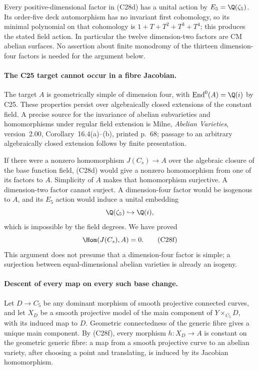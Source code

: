 Every positive-dimensional factor in (C28d) has a
unital action by $E_5=\Q(\zeta_5)$.  Its order-five
deck automorphism has no invariant first cohomology,
so its minimal polynomial on that cohomology is
$1+T+T^2+T^3+T^4$; this produces the stated field action.
In particular the twelve dimension-two factors are
CM abelian surfaces.  No assertion about finite
monodromy of the thirteen dimension-four factors is
needed for the argument below.

\paragraph{The C25 target cannot occur in a fibre Jacobian.}
The target $A$ is geometrically simple of dimension four,
with $\operatorname{End}^0(A)=\Q(i)$ by C25.
These properties persist over algebraically closed
extensions of the constant field.  A precise source
for the invariance of abelian subvarieties and
homomorphisms under regular field extension is Milne,
\emph{Abelian Varieties}, version~2.00, Corollary~16.4(a)--(b),
printed p.~68; passage to an arbitrary algebraically
closed extension follows by finite presentation.

If there were a nonzero homomorphism $J(C_s)\to A$
over the algebraic closure of the base function field,
(C28d) would give a nonzero homomorphism from one of
its factors to $A$.  Simplicity of $A$ makes that
homomorphism surjective.  A dimension-two factor
cannot surject.  A dimension-four factor would be
isogenous to $A$, and its $E_5$ action would induce
a unital embedding
\[
                  \Q(\zeta_5)\hookrightarrow\Q(i),
\]
which is impossible by the field degrees.  We have proved
\[
                         \Hom(J(C_s),A)=0.       \tag{C28f}
\]
This argument does not presume that a dimension-four
factor is simple; a surjection between equal-dimensional
abelian varieties is already an isogeny.

\paragraph{Descent of every map on every such base change.}
Let $D\to C_5$ be any dominant morphism of smooth
projective connected curves, and let $X_D$ be a smooth
projective model of the main component of
$Y\times_{C_5}D$, with its induced map to $D$.
Geometric connectedness of the generic fibre gives
a unique main component.  By (C28f), every morphism
$h:X_D\to A$ is constant on the geometric generic
fibre: a map from a smooth projective curve to an
abelian variety, after choosing a point and translating,
is induced by its Jacobian homomorphism.

